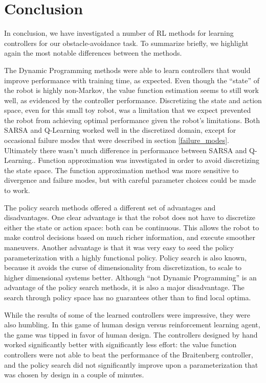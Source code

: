 \documentclass{article}
\begin{document}
\section{Conclusion}

In conclusion, we have investigated a number of RL methods for learning controllers for our obstacle-avoidance task.  To summarize briefly, we highlight again the most notable differences between the methods.

The Dynamic Programming methods were able to learn controllers that would improve performance with training time, as expected.  Even though the ``state'' of the robot is highly non-Markov, the value function estimation seems to still work well, as evidenced by the controller performance.  Discretizing the state and action space, even for this small toy robot, was a limitation that we expect prevented the robot from achieving optimal performance given the robot's limitations. Both SARSA and Q-Learning worked well in the discretized domain, except for occasional failure modes that were described in section \ref{failure_modes}. Ultimately there wasn't much difference in performance between SARSA and Q-Learning.. Function approximation was investigated in order to avoid discretizing the state space. The function approximation method was more sensitive to divergence and failure modes, but with careful parameter choices could be made to work.

The policy search methods offered a different set of advantages and disadvantages.  One clear advantage is that the robot does not have to discretize either the state or action space: both can be continuous.  This allows the robot to make control decisions based on much richer information, and execute smoother maneuvers.  Another advantage is that it was very easy to seed the policy parameterization with a highly functional policy.  Policy search is also known, because it avoids the curse of dimensionality from discretization, to scale to higher dimensional systems better.  Although ``not Dynamic Programming'' is an advantage of the policy search methods, it is also a major disadvantage.  The search through policy space has no guarantees other than to find local optima.

While the results of some of the learned controllers were impressive, they were also humbling.  In this game of human design versus reinforcement learning agent, the game was tipped in favor of human design. The controllers designed by hand worked significantly better with significantly less effort:  the value function controllers were not able to beat the performance of the Braitenberg controller, and the policy search did not significantly improve upon a parameterization that was chosen by design in a couple of minutes.
\end{document}
